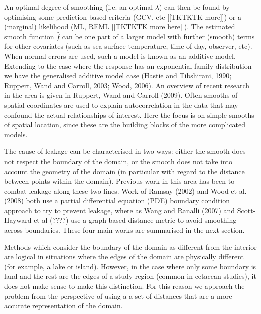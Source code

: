 \documentclass[useAMS, referee]{biom}
\begin{document}
An optimal degree of smoothing (i.e. an optimal $\lambda$) can then be found by optimising some prediction based criteria (GCV, etc [[TKTKTK more]]) or a (marginal) likelihood (ML, REML [[TKTKTK more here]]). The estimated smooth function $\hat{f}$ can be one part of a larger model with further (smooth) terms for other covariates (such as sea surface temperature, time of day, observer, etc). When normal errors are used, such a model is known as an additive model. Extending to the case where the response has an exponential family distribution we have the generalised additive model case (Hastie and Tibshirani, 1990; Ruppert, Wand and Carroll, 2003; Wood, 2006). An overview of recent research in the area is given in Ruppert, Wand and Carroll (2009). Often smooths of spatial coordinates are used to explain autocorrelation in the data that may confound the actual relationships of interest. Here the focus is on simple smooths of spatial location, since these are the building blocks of the more complicated models.

The cause of leakage can be characterised in two ways: either the smooth does not respect the boundary of the domain, or the smooth does not take into account the geometry of the domain (in particular with regard to the distance between points within the domain). Previous work in this area has been to combat leakage along these two lines. Work of Ramsay (2002) and Wood et al. (2008) both use a partial differential equation (PDE) boundary condition approach to try to prevent leakage, where as Wang and Ranalli (2007) and Scott-Hayward et al (????) use a graph-based distance metric to avoid smoothing across boundaries. These four main works are summarised in the next section.

Methods which consider the boundary of the domain as different from the interior are logical in situations where the edges of the domain are physically different (for example, a lake or island). However, in the case where only some boundary is land and the rest are the edges of a study region (common in cetacean studies), it does not make sense to make this distinction. For this reason we approach the problem from the perspective of using a a set of distances that are a more accurate representation of the domain.
\end{document}
